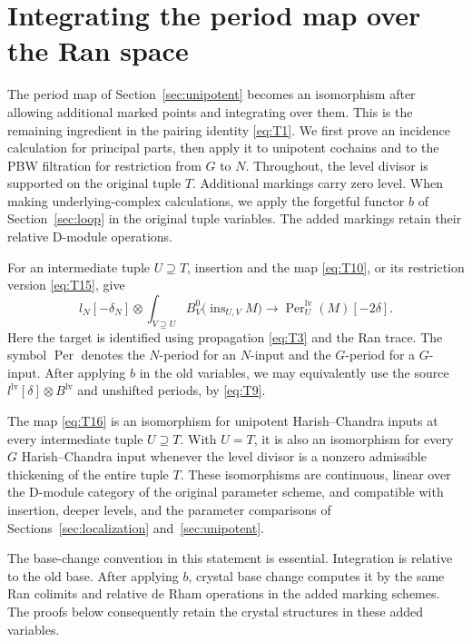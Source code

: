 \section{Integrating the period map over the Ran space}
\label{sec:ran}

The period map of Section~\ref{sec:unipotent} becomes an isomorphism after
allowing additional marked points and integrating over them.  This is the
remaining ingredient in the pairing identity \eqref{eq:T1}.  We first prove
an incidence calculation for principal parts, then apply it to unipotent
cochains and to the PBW filtration for restriction from $G$ to $N$.
Throughout, the level divisor is supported on the original tuple $T$.
Additional markings carry zero level.  When making underlying-complex
calculations, we apply the forgetful functor $b$ of
Section~\ref{sec:loop} in the original tuple variables.  The added
markings retain their relative D-module operations.

For an intermediate tuple $U\supseteq T$, insertion and the map
\eqref{eq:T10}, or its restriction version \eqref{eq:T15}, give
\begin{equation}\label{eq:T16}
 l_N[-\delta_N]\otimes
 \int_{V\supseteq U} B^0_V\bigl(\operatorname{ins}_{U,V}M\bigr)
 \longrightarrow \operatorname{Per}^{\mathrm{lv}}_U(M)[-2\delta].
\end{equation}
Here the target is identified using propagation \eqref{eq:T3} and the Ran
trace.  The symbol $\operatorname{Per}$ denotes the $N$-period for an
$N$-input and the $G$-period for a $G$-input.  After applying $b$ in the old variables, we
may equivalently use the source
$l^{\mathrm{lv}}[\delta]\otimes B^{\mathrm{lv}}$ and unshifted periods,
by \eqref{eq:T9}.

\begin{proposition}\label{prop:ran-integrated-period}
The map \eqref{eq:T16} is an isomorphism for unipotent Harish--Chandra
inputs at every intermediate tuple $U\supseteq T$.  With $U=T$, it is
also an isomorphism for every $G$ Harish--Chandra input whenever the
level divisor is a nonzero admissible thickening of the entire tuple $T$.
These isomorphisms are
continuous, linear over the D-module category of the original parameter
scheme, and compatible with insertion, deeper levels, and the parameter
comparisons of Sections~\ref{sec:localization} and~\ref{sec:unipotent}.
\end{proposition}

The base-change convention in this statement is essential.  Integration is
relative to the old base.  After applying $b$, crystal base change computes it
by the same Ran colimits and relative de Rham operations in the added
marking schemes.  The proofs below consequently retain the crystal
structures in these added variables.

